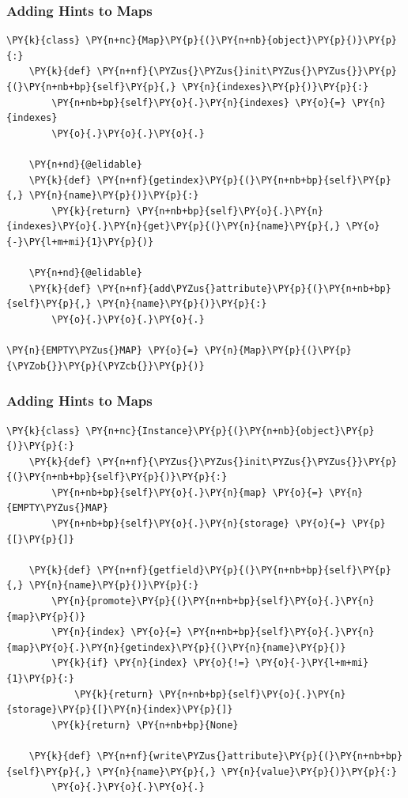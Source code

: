 \documentclass[utf8x]{beamer}
\begin{document}
\begin{frame}[containsverbatim]
\frametitle{Adding Hints to Maps}

\begin{Verbatim}[commandchars=\\\{\}]
\PY{k}{class} \PY{n+nc}{Map}\PY{p}{(}\PY{n+nb}{object}\PY{p}{)}\PY{p}{:}
    \PY{k}{def} \PY{n+nf}{\PYZus{}\PYZus{}init\PYZus{}\PYZus{}}\PY{p}{(}\PY{n+nb+bp}{self}\PY{p}{,} \PY{n}{indexes}\PY{p}{)}\PY{p}{:}
        \PY{n+nb+bp}{self}\PY{o}{.}\PY{n}{indexes} \PY{o}{=} \PY{n}{indexes}
        \PY{o}{.}\PY{o}{.}\PY{o}{.}

    \PY{n+nd}{@elidable}
    \PY{k}{def} \PY{n+nf}{getindex}\PY{p}{(}\PY{n+nb+bp}{self}\PY{p}{,} \PY{n}{name}\PY{p}{)}\PY{p}{:}
        \PY{k}{return} \PY{n+nb+bp}{self}\PY{o}{.}\PY{n}{indexes}\PY{o}{.}\PY{n}{get}\PY{p}{(}\PY{n}{name}\PY{p}{,} \PY{o}{-}\PY{l+m+mi}{1}\PY{p}{)}

    \PY{n+nd}{@elidable}
    \PY{k}{def} \PY{n+nf}{add\PYZus{}attribute}\PY{p}{(}\PY{n+nb+bp}{self}\PY{p}{,} \PY{n}{name}\PY{p}{)}\PY{p}{:}
        \PY{o}{.}\PY{o}{.}\PY{o}{.}

\PY{n}{EMPTY\PYZus{}MAP} \PY{o}{=} \PY{n}{Map}\PY{p}{(}\PY{p}{\PYZob{}}\PY{p}{\PYZcb{}}\PY{p}{)}
\end{Verbatim}
\end{frame}

\begin{frame}[containsverbatim]
\frametitle{Adding Hints to Maps}

\begin{Verbatim}[commandchars=\\\{\}]
\PY{k}{class} \PY{n+nc}{Instance}\PY{p}{(}\PY{n+nb}{object}\PY{p}{)}\PY{p}{:}
    \PY{k}{def} \PY{n+nf}{\PYZus{}\PYZus{}init\PYZus{}\PYZus{}}\PY{p}{(}\PY{n+nb+bp}{self}\PY{p}{)}\PY{p}{:}
        \PY{n+nb+bp}{self}\PY{o}{.}\PY{n}{map} \PY{o}{=} \PY{n}{EMPTY\PYZus{}MAP}
        \PY{n+nb+bp}{self}\PY{o}{.}\PY{n}{storage} \PY{o}{=} \PY{p}{[}\PY{p}{]}

    \PY{k}{def} \PY{n+nf}{getfield}\PY{p}{(}\PY{n+nb+bp}{self}\PY{p}{,} \PY{n}{name}\PY{p}{)}\PY{p}{:}
        \PY{n}{promote}\PY{p}{(}\PY{n+nb+bp}{self}\PY{o}{.}\PY{n}{map}\PY{p}{)}
        \PY{n}{index} \PY{o}{=} \PY{n+nb+bp}{self}\PY{o}{.}\PY{n}{map}\PY{o}{.}\PY{n}{getindex}\PY{p}{(}\PY{n}{name}\PY{p}{)}
        \PY{k}{if} \PY{n}{index} \PY{o}{!=} \PY{o}{-}\PY{l+m+mi}{1}\PY{p}{:}
            \PY{k}{return} \PY{n+nb+bp}{self}\PY{o}{.}\PY{n}{storage}\PY{p}{[}\PY{n}{index}\PY{p}{]}
        \PY{k}{return} \PY{n+nb+bp}{None}

    \PY{k}{def} \PY{n+nf}{write\PYZus{}attribute}\PY{p}{(}\PY{n+nb+bp}{self}\PY{p}{,} \PY{n}{name}\PY{p}{,} \PY{n}{value}\PY{p}{)}\PY{p}{:}
        \PY{o}{.}\PY{o}{.}\PY{o}{.}
\end{Verbatim}
\end{frame}
\end{document}
